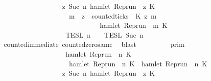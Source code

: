\begin{isabellebody}
\ \ \ \ \ \ \ \ \ \ \ \ \ \ \ \ {\isasyminter}\ {\isacharbraceleft}{\isasymrho}{\isachardot}\ {\isasymforall}z{\isasymge}\ Suc\ n{\isachardot}\ hamlet\ {\isacharparenleft}{\isacharparenleft}Rep{\isacharunderscore}run\ {\isasymrho}{\isacharparenright}\ z\ K\ {\isasymlongrightarrow}\isanewline
\ \ \ \ \ \ \ \ \ \ \ \ \ \ \ \ \ \ \ \ {\isacharparenleft}{\isasymforall}m\ {\isasymge}\ z{\isachardot}\ \ counted{\isacharunderscore}ticks\ {\isasymrho}\ K\ z\ m\ {}\isanewline
\ \ \ \ \ \ \ \ \ \ \ \ \ \ \ \ \ \ \ \ \ \ \ \ \ \ \ \ {\isasymlongrightarrow}\ hamlet\ {\isacharparenleft}{\isacharparenleft}Rep{\isacharunderscore}run\ {\isasymrho}{\isacharparenright}\ m\ K\ {\isacharbraceright}\isanewline
\ \ \ \ \ \ \ \ \ \ \ \ \ \ \ \ {\isasyminter}\ {\isasymlbrakk}{\isasymlbrakk}\ {\isasymPsi}\ {\isasymrbrakk}{\isasymrbrakk}\isactrlsub T\isactrlsub E\isactrlsub S\isactrlsub L\isactrlbsup {\isasymge}\ n\isactrlesup \ {\isasyminter}\ {\isasymlbrakk}{\isasymlbrakk}\ {\isasymPhi}\ {\isasymrbrakk}{\isasymrbrakk}\isactrlsub T\isactrlsub E\isactrlsub S\isactrlsub L\isactrlbsup {\isasymge}\ Suc\ n\isactrlesup {\isacartoucheclose}\isanewline
\ \ \ \ \ \ \isamarkupfalse%
\ counted{\isacharunderscore}immediate\ counted{\isacharunderscore}zero{\isacharunderscore}same\ \isamarkupfalse%
\ blast\isanewline
\ \ \isamarkupfalse%
\ \isamarkupfalse%
\ {\isacartoucheopen}{\isachardot}{\isachardot}{\isachardot}\ {\isacharequal}\ {\isasymlbrakk}{\isasymlbrakk}\ {\isasymGamma}\ {\isasymrbrakk}{\isasymrbrakk}\isactrlsub p\isactrlsub r\isactrlsub i\isactrlsub m\isanewline
\ \ \ \ \ \ \ \ \ \ \ \ \ \ \ \ {\isasyminter}\ {\isacharparenleft}\ {\isacharbraceleft}{\isasymrho}{\isachardot}\ {\isasymnot}hamlet\ {\isacharparenleft}{\isacharparenleft}Rep{\isacharunderscore}run\ {\isasymrho}{\isacharparenright}\ n\ K\isanewline
\ \ \ \ \ \ \ \ \ \ \ \ \ \ \ \ \ \ {\isasymunion}\ {\isacharbraceleft}{\isasymrho}{\isachardot}\ hamlet\ {\isacharparenleft}{\isacharparenleft}Rep{\isacharunderscore}run\ {\isasymrho}{\isacharparenright}\ n\ K\ {\isasymand}\ hamlet\ {\isacharparenleft}{\isacharparenleft}Rep{\isacharunderscore}run\ {\isasymrho}{\isacharparenright}\ n\ K\ {\isacharparenright}\isanewline
\ \ \ \ \ \ \ \ \ \ \ \ \ \ \ \ {\isasyminter}\ {\isacharbraceleft}{\isasymrho}{\isachardot}\ {\isasymforall}z{\isasymge}\ Suc\ n{\isachardot}\ hamlet\ {\isacharparenleft}{\isacharparenleft}Rep{\isacharunderscore}run\ {\isasymrho}{\isacharparenright}\ z\ K\ {\isasymlongrightarrow}\isanewline

\end{isabellebody}

